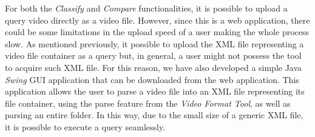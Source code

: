 For both the \emph{Classify} and \emph{Compare} functionalities, it is possible to upload a query video directly as a video file. However, since this is a web application, there could be some limitations in the upload speed of a user making the whole process slow. As mentioned previously, it possible to upload the XML file representing a video file container as a query but, in general, a user might not possess the tool to acquire such XML file. For this reason, we have also developed a simple Java \emph{Swing} GUI application that can be downloaded from the web application. This application allows the user to parse a video file into an XML file representing its file container, using the parse feature from the \emph{Video Format Tool}, as well as parsing an entire folder. In this way, due to the small size of a generic XML file, it is possible to execute a query seamlessly.